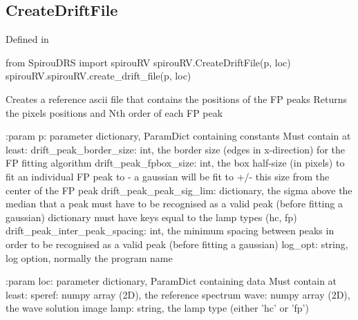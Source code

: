 \noindent\begin{minipage}{\textwidth}
\subsection{CreateDriftFile}

Defined in \spirouRV{}

\begin{pythonbox}
from SpirouDRS import spirouRV
spirouRV.CreateDriftFile(p, loc)
spirouRV.spirouRV.create_drift_file(p, loc)
\end{pythonbox}

\begin{pythondocstring}
Creates a reference ascii file that contains the positions of the FP peaks
Returns the pixels positions and Nth order of each FP peak

:param p: parameter dictionary, ParamDict containing constants
    Must contain at least:
            drift_peak_border_size: int, the border size (edges in
                                    x-direction) for the FP fitting
                                    algorithm
            drift_peak_fpbox_size: int, the box half-size (in pixels) to
                                   fit an individual FP peak to - a
                                   gaussian will be fit to +/- this size
                                   from the center of the FP peak
            drift_peak_peak_sig_lim: dictionary, the sigma above the median
                                     that a peak must have to be recognised
                                     as a valid peak (before fitting a
                                     gaussian) dictionary must have keys
                                     equal to the lamp types (hc, fp)
            drift_peak_inter_peak_spacing: int, the minimum spacing between
                                           peaks in order to be recognised
                                           as a valid peak (before fitting
                                           a gaussian)
            log_opt: string, log option, normally the program name

:param loc: parameter dictionary, ParamDict containing data
        Must contain at least:
            speref: numpy array (2D), the reference spectrum
            wave: numpy array (2D), the wave solution image
            lamp: string, the lamp type (either 'hc' or 'fp')


\end{pythondocstring}
\end{minipage}

